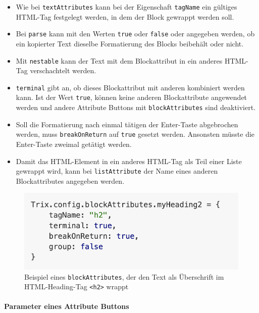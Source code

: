 \begin{itemize}
	\item Wie bei \texttt{textAttributes} kann bei der Eigenschaft \texttt{tagName} ein gültiges HTML-Tag festgelegt werden, in dem der Block gewrappt werden soll. 
	\item Bei \texttt{parse} kann mit den Werten \texttt{true} oder \texttt{false} oder angegeben werden, ob ein kopierter Text dieselbe Formatierung des Blocks beibehält oder nicht.
	\item Mit \texttt{nestable} kann der Text mit dem Blockattribut in ein anderes HTML-Tag verschachtelt werden. 
	\item \texttt{terminal} gibt an, ob dieses Blockattribut mit anderen kombiniert werden kann. Ist der Wert \texttt{true}, können keine anderen Blockattribute angewendet werden und andere Attribute Buttons mit \texttt{blockAttributes} sind deaktiviert.
	\item Soll die Formatierung nach einmal tätigen der Enter-Taste abgebrochen werden, muss \texttt{breakOnReturn} auf \texttt{true} gesetzt werden. Ansonsten müsste die Enter-Taste zweimal getätigt werden.
	\item Damit das HTML-Element in ein anderes HTML-Tag als Teil einer Liste gewrappt wird, kann bei \texttt{listAttribute} der Name eines anderen Blockattributes angegeben werden.
\end{itemize}

\begin{figure}[H]
\begin{center}
	\includegraphics[scale=.7]{images/block_attributes_example.png}
\end{center}
	\caption{Beispiel eines \texttt{blockAttributes}, der den Text als Überschrift im HTML-Heading-Tag \texttt{<h2>} wrappt}
\end{figure}

\paragraph{Parameter eines Attribute Buttons}\mbox{}\\

